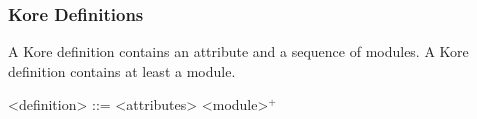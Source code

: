 \documentclass[UTF8,11pt]{article}
\theoremstyle{plain}
\theoremstyle{definition}
\theoremstyle{remark}
\newcommand{\Nat}{\textit{Nat}}
\newcommand{\List}{\textit{List}}
\newcommand{\Map}{\textit{Map}}
\newcommand{\parametric}[2]{{#1}\raisebox{.2ex}{\texttt{\footnotesize{\{}}}#2\raisebox{.2ex}{\texttt{\footnotesize{\}}}}}
\begin{document}
\subsubsection{Kore Definitions}

A Kore definition contains an attribute and a sequence of modules.
A Kore definition contains at least a module.

\begin{grammar}\small
<definition> ::= <attributes> <module>$^+$
\end{grammar}

%
%
%
%
%
%
% 
%  
%
%
\end{document}
